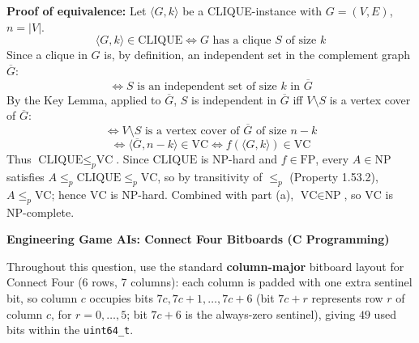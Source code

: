 \documentclass[12pt,addpoints]{exam}
\begin{document}
\begin{questions}
\begin{parts}
\begin{solution}
\textbf{Proof of equivalence:} Let $\langle G,k\rangle$ be a CLIQUE-instance with $G=(V,E)$, $n=|V|$.
$$\langle G,k\rangle \in \text{CLIQUE} \iff G \text{ has a clique } S \text{ of size } k$$
Since a clique in $G$ is, by definition, an independent set in the complement graph $\overline{G}$:
$$\iff S \text{ is an independent set of size } k \text{ in } \overline{G}$$
By the Key Lemma, applied to $\overline{G}$, $S$ is independent in $\overline{G}$ iff $V \setminus S$ is a vertex cover of $\overline{G}$:
$$\iff V \setminus S \text{ is a vertex cover of } \overline{G} \text{ of size } n-k$$
$$\iff \langle \overline{G}, n-k \rangle \in \text{VC} \iff f(\langle G,k\rangle) \in \text{VC}$$
Thus $\text{CLIQUE} \le_p \text{VC}$. Since $\text{CLIQUE}$ is NP-hard and $f \in \text{FP}$, every $A \in \text{NP}$ satisfies $A \le_p \text{CLIQUE} \le_p \text{VC}$, so by transitivity of $\le_p$ (Property 1.53.2), $A \le_p \text{VC}$; hence $\text{VC}$ is NP-hard. Combined with part (a), $\text{VC} \in \text{NP}$, so $\text{VC}$ is NP-complete.
\end{solution}
\end{parts}

\question[15] \textbf{Engineering Game AIs: Connect Four Bitboards (C Programming)}

Throughout this question, use the standard \textbf{column-major} bitboard layout for Connect Four (6 rows, 7 columns): each column is padded with one extra sentinel bit, so column $c$ occupies bits $7c, 7c+1,\dots,7c+6$ (bit $7c+r$ represents row $r$ of column $c$, for $r=0,\dots,5$; bit $7c+6$ is the always-zero sentinel), giving $49$ used bits within the \texttt{uint64\_t}.

\end{questions}
\end{document}
